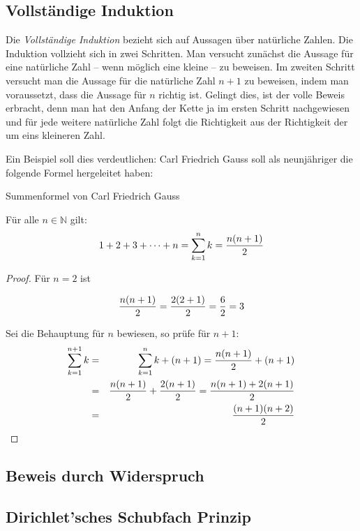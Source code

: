 \subsection{Vollständige Induktion}

Die \emph{Vollständige Induktion} bezieht sich auf Aussagen über natürliche Zahlen. Die Induktion vollzieht sich in zwei Schritten. Man versucht zunächst die Aussage für eine natürliche Zahl -- wenn möglich eine kleine -- zu beweisen. Im zweiten Schritt versucht man die Aussage für die natürliche Zahl $n+1$ zu beweisen, indem man voraussetzt, dass die Aussage für $n$ richtig ist. Gelingt dies, ist der volle Beweis erbracht, denn man hat den Anfang der Kette ja im ersten Schritt nachgewiesen und für jede weitere natürliche Zahl folgt die Richtigkeit aus der Richtigkeit der um eins kleineren Zahl.

Ein Beispiel soll dies verdeutlichen: Carl Friedrich Gauss soll als neunjähriger die folgende Formel hergeleitet haben:

\begin{theorem}
Summenformel von Carl Friedrich Gauss
\begin{claim}
Für alle $n\in \mathbb{N}$ gilt:
\[ 1+2+3+ \dots +n = \sum_{k=1}^{n}k = {n(n+1)\over 2} \]
\end{claim}
\begin{proof}
Für $n=2$ ist

\[ {n(n+1)\over 2} = {2(2+1)\over 2} = {6\over 2} = 3 \]

Sei die Behauptung für $n$ bewiesen, so prüfe für $n+1$:
\begin{eqnarray*}
\sum_{k=1}^{n+1} k &=& \sum_{k=1}^{n} k  + (n+1) = {n(n+1)\over 2} +(n+1) \\
 &=& {n(n+1)\over 2} +{2(n+1)\over 2} = {n(n+1)+2(n+1) \over 2} \\
 &=& {(n+1)(n+2) \over 2}
\end{eqnarray*}
\end{proof}

\end{theorem}


\subsection{Beweis durch Widerspruch}

\subsection{Dirichlet'sches Schubfach Prinzip}

